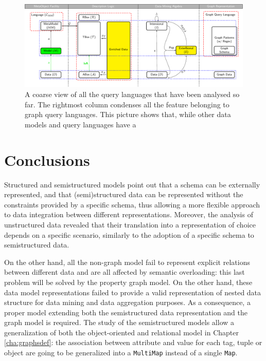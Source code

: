 \begin{figure}[!t]
	\centering
	\includegraphics[width=\textwidth]{fig/02models/taonta}
	\caption{A coarse view of all the query languages that have been analysed so far. The rightmost column condenses all the feature  belonging to graph query languages. This picture shows that, while other data models and query languages have a }
	\label{fig:taonta}
\end{figure}
\section{Conclusions}

Structured and semistructured
models point out that a schema can be externally represented, and that (semi)structured data can be represented without the constraints provided by a specific schema, thus allowing a more flexible approach to data integration between different representations. Moreover, the analysis of unstructured data revealed that their translation into a representation of choice depends on a specific scenario, similarly to the adoption of a specific schema to semistructured data.

On the other hand, all the non-graph model fail to represent explicit relations between different data and are all affected by semantic overloading: this last problem will be solved by the property graph model. On the other hand, these data model representations failed to provide a valid representation of nested data structure for data mining and data aggregation purposes. As a consequence, a proper model extending both the semistructured data representation and the graph model is required. The study of the semistructured models allow a generalization of both the object-oriented and relational model in Chapter \vref{cha:graphsdef}: the association between attribute and value for each tag, tuple or object are going to be generalized into a \texttt{MultiMap} instead of a single \texttt{Map}.

